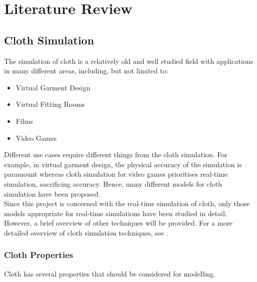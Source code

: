 \chapter{Literature Review}

\section{Cloth Simulation}
The simulation of cloth is a relatively old and well studied field with applications in many different areas, including, but not limited to:
\begin{itemize}
  \item{Virtual Garment Design}
  \item{Virtual Fitting Rooms}
  \item{Films}
  \item{Video Games}
\end{itemize}
Different use cases require different things from the cloth simulation. For example, in virtual garment design, the physical accuracy of the simulation is paramount whereas cloth simulation for video games prioritises real-time simulation, sacrificing accuracy. Hence, many different models for cloth simulation have been proposed.
\\Since this project is concerned with the real-time simulation of cloth, only those models appropriate for real-time simulations have been studied in detail. However, a brief overview of other techniques will be provided. For a more detailed overview of cloth simulation techniques, see \textcite{Ng1996}.

\subsection{Cloth Properties}
Cloth has several properties that should be considered for modelling.


